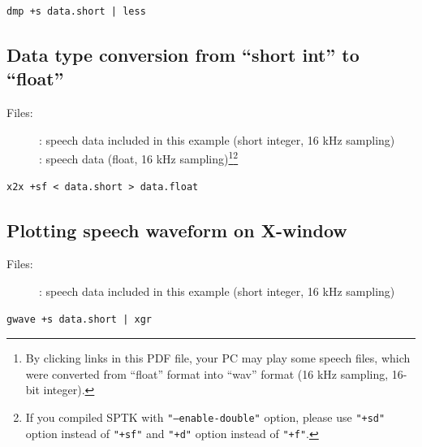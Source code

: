 \documentclass[a4paper,10pt]{article}
\begin{document}
\begin{verbatim}
dmp +s data.short | less
\end{verbatim}

\subsection{Data type conversion from ``short int'' to ``float''}

\begin{description}
\item[Files:]
  :
           speech data included in this example (short integer, 16 kHz sampling)\\
  :
  speech data (float, 16 kHz sampling)\footnote{By clicking links in this PDF file, your PC may play some speech files, which
were converted from ``float'' format into ``wav'' format
(16 kHz sampling, 16-bit integer).}\footnote{If you compiled SPTK with
\texttt{"--enable-double"} option, please use \texttt{"+sd"} option instead
of \texttt{"+sf"} and \texttt{"+d"} option instead
of \texttt{"+f"}.}\\
\end{description}

\begin{verbatim}
x2x +sf < data.short > data.float
\end{verbatim}

\subsection{Plotting speech waveform on X-window}

\begin{description}
\item[Files:]
  : speech data included in this example (short integer, 16 kHz sampling)
\end{description}

\begin{verbatim}
gwave +s data.short | xgr
\end{verbatim}
\end{document}
